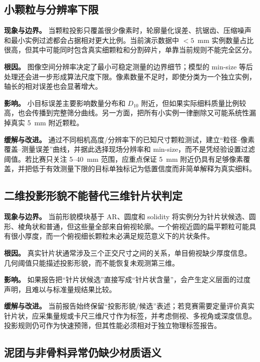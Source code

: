 \subsection{小颗粒与分辨率下限}
\label{sec:limit-small-particles}

\textbf{现象与边界。} 当颗粒投影只覆盖很少像素时，轮廓量化误差、抗锯齿、压缩噪声和最小实例过滤都会占据相对更大比例。当前演示数据中 $<5$~mm 实例数量占比很高，但其中可能同时包含真实细颗粒和分割碎片，单靠当前规则不能完全区分。

\textbf{根因。} 图像空间分辨率决定了最小可稳定测量的边界细节；模型的 min-size 等后处理还会进一步形成算法尺度下限。像素数量不足时，即使分类为一个独立实例，轴长的相对误差也会显著增大。

\textbf{影响。} 小目标误差主要影响数量分布和 $D_{10}$ 附近，但如果实际细料质量比例较高，也会传播到完整筛分曲线。另一方面，把所有小实例一律删除又可能系统性漏掉真实 5~mm 附近颗粒。

\textbf{缓解与改进。} 通过不同相机高度/分辨率下的已知尺寸颗粒测试，建立“粒径--像素覆盖--测量误差”曲线，并据此选择现场分辨率和 min-size，而不是凭经验设置过滤阈值。若比赛只关注 5--40~mm 范围，应重点保证 5~mm 附近仍具有足够像素覆盖，并把低于有效测量下限的目标单独标记为低置信度而非简单解释为真实细料。

\subsection{二维投影形貌不能替代三维针片状判定}
\label{sec:limit-morphology}

\textbf{现象与边界。} 当前形貌模块基于 AR、圆度和 solidity 将实例分为针片状候选、圆形、棱角状和普通，但这些量全部来自俯视轮廓。一个俯视近圆的扁平颗粒可能具有很小厚度，而一个俯视细长颗粒未必满足规范意义下的片状条件。

\textbf{根因。} 真实针片状通常涉及三个正交尺寸之间的关系，单目俯视缺少厚度信息。几何阈值只能描述投影形貌，而不能恢复未观测第三维。

\textbf{影响。} 如果报告把“针片状候选”直接写成“针片状含量”，会产生定义层面的过度声明，且难以与标准量规结果比较。

\textbf{缓解与改进。} 当前报告始终保留“投影形貌/候选”表述；若竞赛需要定量评价真实针片状，应采集量规或卡尺三维尺寸作为标签，并考虑侧视、多视角或深度信息。投影规则仍可作为快速预筛，但其性能必须相对于独立物理标签报告。

\subsection{泥团与非骨料异常仍缺少材质语义}
\label{sec:limit-mud}

